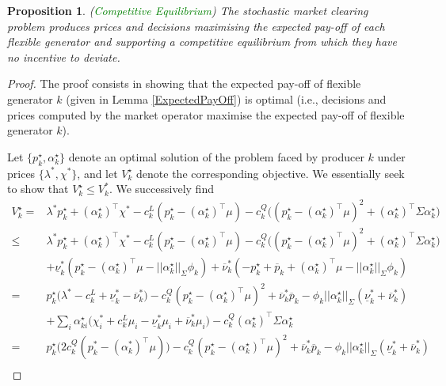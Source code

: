 \documentclass{article}
\newtheorem{proposition}{Proposition}
\begin{document}
\begin{proposition}
(\textcolor{green}{Competitive Equilibrium}) The stochastic market clearing problem produces prices and decisions maximising the expected pay-off of each flexible generator and supporting a competitive equilibrium from which they have no incentive to deviate.
\end{proposition}
\begin{proof}
The proof consists in showing that the expected pay-off of flexible generator $k$ (given in Lemma \ref{ExpectedPayOff}) is optimal (i.e., decisions and prices computed by the market operator maximise the expected pay-off of flexible generator $k$).

Let $\{p_k^\star, \alpha_k^\star\}$ denote an optimal solution of the problem faced by producer $k$ under prices $\{\lambda^*, \chi^*\}$, and let $V_k^\star$ denote the corresponding objective. We essentially seek to show that $V_k^\star \le V_k^*$. We successively find
\begin{align*}
    V_k^\star =& \lambda^*p_k^\star + (\alpha_k^\star)^\top \chi^* - c_k^L(p_k^\star - (\alpha_k^\star)^\top \mu) - c_k^Q\big((p_k^\star - (\alpha_k^\star)^\top \mu)^2 + (\alpha_k^\star)^\top \Sigma \alpha_k^\star\big)\\
    \le& \lambda^*p_k^\star + (\alpha_k^\star)^\top \chi^* - c_k^L(p_k^\star - (\alpha_k^\star)^\top \mu) - c_k^Q\big((p_k^\star - (\alpha_k^\star)^\top \mu)^2 + (\alpha_k^\star)^\top \Sigma \alpha_k^\star\big)\\
    &+ \underline{\nu}_k^*(p_k^\star - (\alpha_k^\star)^\top \mu - ||\alpha_k^\star||_{\Sigma} \phi_k) + \overline{\nu}_k^* (-p_k^\star + \overline{p}_k + (\alpha_k^\star)^\top \mu - ||\alpha_k^\star||_{\Sigma} \phi_k)\\
    =& p_k^\star\big(\lambda^* - c_k^L + \underline{\nu}_k^* - \overline{\nu}_k^*\big) - c_k^Q(p_k^\star - (\alpha_k^\star)^\top \mu)^2 + \overline{\nu}_k^* \overline{p}_k - \phi_k ||\alpha_k^\star||_\Sigma (\underline{\nu}_k^* + \overline{\nu}_k^*)\\
    &+ \sum_i \alpha_{ki}^\star\big(\chi_i^* + c_k^L \mu_i - \underline{\nu}_k^* \mu_i + \overline{\nu}_k^* \mu_i\big) - c_k^Q (\alpha_k^\star)^\top \Sigma \alpha_k^\star \\
   =& p_k^\star\big(2c_k^Q(p_k^* - (\alpha_k^*)^\top \mu)\big) - c_k^Q(p_k^\star - (\alpha_k^\star)^\top \mu)^2 + \overline{\nu}_k^* \overline{p}_k - \phi_k ||\alpha_k^\star||_\Sigma (\underline{\nu}_k^* + \overline{\nu}_k^*)\\    

\end{align*}
\end{proof}
\end{document}
